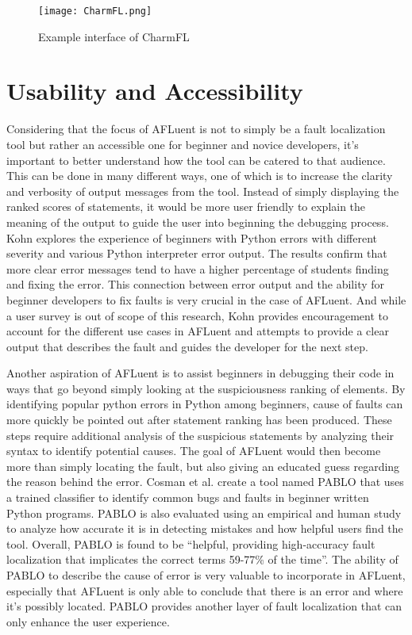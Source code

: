 \begin{figure}[!htb]
	\begin{center}
		\texttt{[image: CharmFL.png]}
		\caption{\label{fig:charmfl} Example interface of CharmFL \cite{sarhan2021charmfl}}
	\end{center}
\end{figure}

\section{Usability and Accessibility}
\label{sec:usability_accessibility}

Considering that the focus of AFLuent is not to simply be a fault localization
tool but rather an accessible one for beginner and novice developers, it's
important to better understand how the tool can be catered to that audience.
This can be done in many different ways, one of which is to increase the clarity
and verbosity of output messages from the tool. Instead of simply displaying the
ranked scores of statements, it would be more user friendly to explain the
meaning of the output to guide the user into beginning the debugging process.
Kohn \cite{kohn2019error} explores the experience of beginners with Python errors
with different severity and various Python interpreter error output. The results
confirm that more clear error messages tend to have a higher percentage of
students finding and fixing the error. This connection between error output and
the ability for beginner developers to fix faults is very crucial in the case of
AFLuent. And while a user survey is out of scope of this research, Kohn
provides encouragement to account for the different use cases in AFLuent and
attempts to provide a clear output that describes the fault and guides the
developer for the next step.

Another aspiration of AFLuent is to assist beginners in debugging their code in
ways that go beyond simply looking at the suspiciousness ranking of elements. By
identifying popular python errors in Python among beginners, cause of faults can
more quickly be pointed out after statement ranking has been produced. These
steps require additional analysis of the suspicious statements by analyzing
their syntax to identify potential causes. The goal of AFLuent would then become
more than simply locating the fault, but also giving an educated guess regarding
the reason behind the error. Cosman et al. \cite{cosman2020pablo} create a tool
named PABLO that uses a trained classifier to identify common bugs and faults in
beginner written Python programs. PABLO is also evaluated using an empirical and
human study to analyze how accurate it is in detecting mistakes and how helpful
users find the tool. Overall, PABLO is found to be ``helpful, providing
high-accuracy fault localization that implicates the correct terms
59-77\% of the time''. The ability of PABLO to describe the cause of error is
very valuable to incorporate in AFLuent, especially that AFLuent is only able to
conclude that there is an error and where it's possibly located. PABLO provides
another layer of fault localization that can only enhance the user experience.

